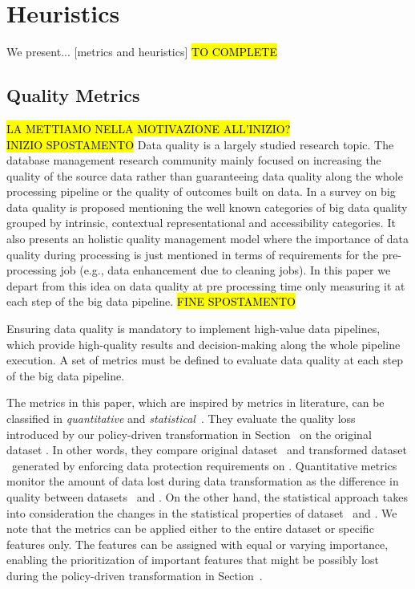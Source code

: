 \section{Heuristics}\label{sec:coalition}
We present... [metrics and heuristics] \hl{TO COMPLETE}


\subsection{Quality Metrics}\label{sec:metrics}

\hl{LA METTIAMO NELLA MOTIVAZIONE ALL'INIZIO?}\\
\hl{INIZIO SPOSTAMENTO}
Data quality is a largely studied research topic. The database management research community mainly focused on increasing the quality of the source data rather than guaranteeing data quality along the whole processing pipeline or the quality of outcomes built on data.
In \cite{BigDataQaulitySurvey} a survey on big data quality is proposed mentioning the well known categories of big data quality grouped by intrinsic,
contextual representational and accessibility categories.
It also presents an holistic quality management model where the importance of data quality during processing is just mentioned in terms of requirements for the pre-processing job (e.g., data enhancement due to cleaning jobs).
In this paper we depart from this idea on data quality at pre processing time only measuring it at each step of the big data pipeline.
\hl{FINE SPOSTAMENTO}

Ensuring data quality is mandatory to implement high-value data pipelines, which provide high-quality results and decision-making along the whole pipeline execution. A set of metrics must be defined to evaluate data quality at each step of the big data pipeline.

The metrics in this paper, which are inspired by metrics in literature, can be classified in \emph{quantitative} and \emph{statistical}~\cite{ADD}. They evaluate the quality loss introduced by our policy-driven transformation in Section~\cite{ADD} on the original dataset \origdataset. In other words, they compare original dataset \origdataset\ and transformed dataset \transdataset\ generated by enforcing data protection requirements on \origdataset. Quantitative metrics monitor the amount of data lost during data transformation as the difference in quality between datasets \origdataset\ and \transdataset.
On the other hand, the statistical approach takes into consideration the changes in the statistical properties of dataset \origdataset\ and \transdataset.
We note that the metrics can be applied either to the entire dataset or specific features only.
The features can be assigned with equal or varying importance, enabling the prioritization of important features that might be possibly lost during the policy-driven transformation in Section~\cite{ADD}.

